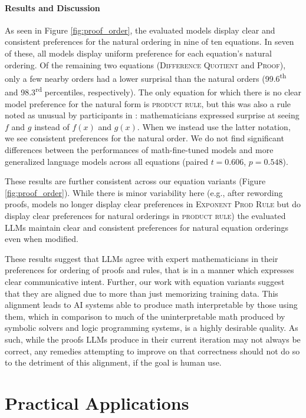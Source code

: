\documentclass{article}
\begin{document}
\paragraph{Results and Discussion} As seen in Figure \ref{fig:proof_order}, the evaluated models display clear and consistent preferences for the natural ordering in nine of ten equations. In seven of these,
all models display uniform preference for each equation's natural ordering. Of the remaining two equations (\textsc{Difference Quotient} and \textsc{Proof}), only a few nearby orders had a lower surprisal than the natural orders (99.6\textsuperscript{th} and 98.3\textsuperscript{rd} percentiles, respectively). The only equation for which there is no clear model preference for the natural form is \textsc{product rule}, but this was also a rule noted as unusual by participants in \citet{mirin2022mathematicians}: mathematicians expressed surprise at seeing $f$ and $g$ instead of $f(x)$ and $g(x)$. When we instead use the latter notation, we see consistent preferences for the natural order.
We do not find significant differences between the performances of math-fine-tuned models and more generalized language models across all equations (paired $t = 0.606$, $p = 0.548$). 

These results are further consistent across our equation variants (Figure \ref{fig:proof_order}). 
While there is minor variability here (e.g., after rewording proofs, models no longer display clear preferences in \textsc{Exponent Prod Rule} but do display clear preferences for natural orderings in \textsc{product rule}) the evaluated LLMs maintain clear and consistent preferences for natural equation orderings even when modified.

 These results suggest that LLMs agree with expert mathematicians in their preferences for ordering of proofs and rules, that is in a manner which expresses clear communicative intent. Further, our work with equation variants suggest that they are aligned due to more than just memorizing training data. This alignment leads to AI systems able to produce math interpretable by those using them, which in comparison to much of the uninterpretable math produced by symbolic solvers and logic programming systems, is a highly desirable quality. As such, while the proofs LLMs produce in their current iteration may not always be correct, any remedies attempting to improve on that correctness should not do so to the detriment of this alignment, if the goal is human use.

\section{Practical Applications}
\end{document}
